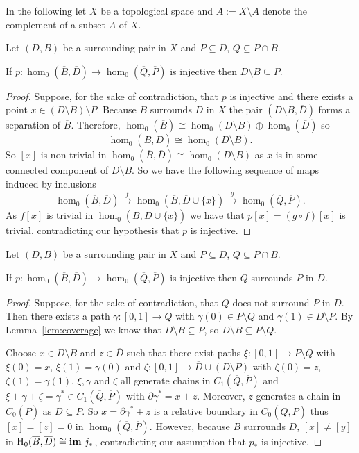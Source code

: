 In the following let $X$ be a topological space and $\overline{A} := X\setminus A$ denote the complement of a subset $A$ of $X$.

\begin{lemma}\label{lem:coverage}
  Let $(D, B)$ be a surrounding pair in $X$ and $P\subseteq D$, $Q\subseteq P\cap B$.

  If $p: \hom_0(\overline{B}, \overline{D})\to \hom_0(\overline{Q}, \overline{P})$ is injective then $D\setminus B\subseteq P$.
\end{lemma}
\begin{proof}
    Suppose, for the sake of contradiction, that $p$ is injective and there exists a point $x\in (D\setminus B)\setminus P$.
    Because $B$ surrounds $D$ in $X$ the pair $(D\setminus B, \overline{D})$ forms a separation of $\overline{B}$.
    Therefore, $\hom_0(\overline{B})\cong \hom_0(D\setminus B)\oplus \hom_0(\overline{D})$ so
    \[ \hom_0(\overline{B}, \overline{D})\cong \hom_0(D\setminus B). \]
    So $[x]$ is non-trivial in $\hom_0(\overline{B},\overline{D})\cong \hom_0(D\setminus B)$ as $x$ is in some connected component of $D\setminus B$.
    So we have the following sequence of maps induced by inclusions
    \[ \hom_0(\overline{B},\overline{D})\xrightarrow{f} \hom_0(\overline{B},\overline{D}\cup\{x\})\xrightarrow{g} \hom_0(\overline{Q},\overline{P}).\]
    As $f[x]$ is trivial in $\hom_0(\overline{B},\overline{D}\cup\{x\})$ we have that $p[x] = (g\circ f)[x]$ is trivial, contradicting our hypothesis that $p$ is injective.
\end{proof}

\begin{lemma}\label{lem:cov_surrounds}
  Let $(D, B)$ be a surrounding pair in $X$ and $P\subseteq D$, $Q\subseteq P\cap B$.

  If $p: \hom_0(\overline{B}, \overline{D})\to \hom_0(\overline{Q}, \overline{P})$ is injective then $Q$ surrounds $P$ in $D$.
\end{lemma}
\begin{proof}
  Suppose, for the sake of contradiction, that $Q$ does not surround $P$ in $D$.
  Then there exists a path $\gamma : [0,1]\to\overline{Q}$ with $\gamma(0)\in P\setminus Q$ and $\gamma(1)\in D\setminus P$.
  By Lemma~\ref{lem:coverage} we know that $D\setminus B\subseteq P$, so $D\setminus B\subseteq P\setminus Q$.

  Choose $x\in D\setminus B$ and $z\in \overline{D}$ such that there exist paths $\xi : [0,1]\to P\setminus Q$ with $\xi(0) = x$, $\xi(1) = \gamma(0)$ and $\zeta : [0,1]\to \overline{D}\cup (D\setminus P)$ with $\zeta(0) = z$, $\zeta(1) = \gamma(1)$.
  $\xi, \gamma$ and $\zeta$ all generate chains in $C_1(\overline{Q}, \overline{P})$ and $\xi + \gamma + \zeta = \gamma^*\in C_1(\overline{Q}, \overline{P})$ with $\partial\gamma^* = x + z$.
  Moreover, $z$ generates a chain in $C_0(\overline{P})$ as $\overline{D}\subseteq\overline{P}$.
  So $x = \partial\gamma^* + z$ is a relative boundary in $C_0(\overline{Q}, \overline{P})$ thus $[x] = [z] = 0$ in $\hom_0(\overline{Q}, \overline{P})$.
  However, because $B$ surrounds $D$, $[x]\neq [y]$ in $\mathrm{H}_0(\overline{B}, \overline{D})\cong \mathbf{im}~j_*$, contradicting our assumption that $p_*$ is injective.
\end{proof}
